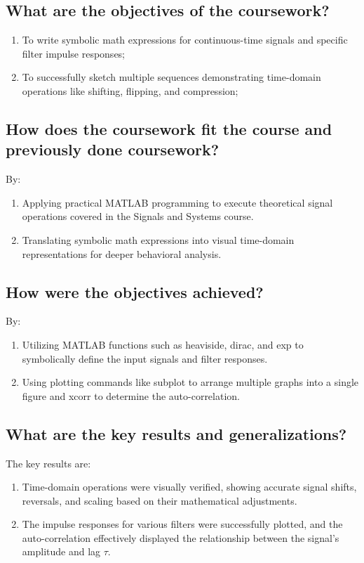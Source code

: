 \subsection{What are the objectives of the coursework?}

\begin{enumerate}
\item To write symbolic math expressions for continuous-time signals and specific filter impulse responses;
\item To successfully sketch multiple sequences demonstrating time-domain operations like shifting, flipping, and compression;
\end{enumerate}	
	
\subsection{How does the coursework fit the course and previously done coursework?}
By:
\begin{enumerate}
\item Applying practical MATLAB programming to execute theoretical signal operations covered in the Signals and Systems course.
\item Translating symbolic math expressions into visual time-domain representations for deeper behavioral analysis.
\end{enumerate}	

\subsection{How were the objectives achieved?}
By:
\begin{enumerate}
\item Utilizing MATLAB functions such as heaviside, dirac, and exp to symbolically define the input signals and filter responses.
\item Using plotting commands like subplot to arrange multiple graphs into a single figure and xcorr to determine the auto-correlation.
\end{enumerate}
	
\subsection{What are the key results and generalizations?}
The key results are:
\begin{enumerate}
\item Time-domain operations were visually verified, showing accurate signal shifts, reversals, and scaling based on their mathematical adjustments.
\item The impulse responses for various filters were successfully plotted, and the auto-correlation effectively displayed the relationship between the signal's amplitude and lag $\tau$.
\end{enumerate}